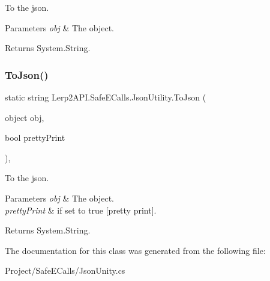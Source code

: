 To the json. 


\begin{DoxyParams}{Parameters}
{\em obj} & The object.\\
\hline
\end{DoxyParams}
\begin{DoxyReturn}{Returns}
System.\+String.
\end{DoxyReturn}
\mbox{\label{class_lerp2_a_p_i_1_1_safe_e_calls_1_1_json_utility_a72a33a009d1a09529f448869f85e6627}} 
\subsubsection{\texorpdfstring{To\+Json()}{ToJson()}\hspace{0.1cm}{\footnotesize\ttfamily [2/2]}}
{\footnotesize\ttfamily static string Lerp2\+A\+P\+I.\+Safe\+E\+Calls.\+Json\+Utility.\+To\+Json (\begin{DoxyParamCaption}\item[{object}]{obj,  }\item[{bool}]{pretty\+Print }\end{DoxyParamCaption})\hspace{0.3cm}{\ttfamily [inline]}, {\ttfamily [static]}}



To the json. 


\begin{DoxyParams}{Parameters}
{\em obj} & The object.\\
\hline
{\em pretty\+Print} & if set to {\ttfamily true} \mbox{[}pretty print\mbox{]}.\\
\hline
\end{DoxyParams}
\begin{DoxyReturn}{Returns}
System.\+String.
\end{DoxyReturn}


The documentation for this class was generated from the following file\+:\begin{DoxyCompactItemize}
\item 
Project/\+Safe\+E\+Calls/Json\+Unity.\+cs\end{DoxyCompactItemize}
